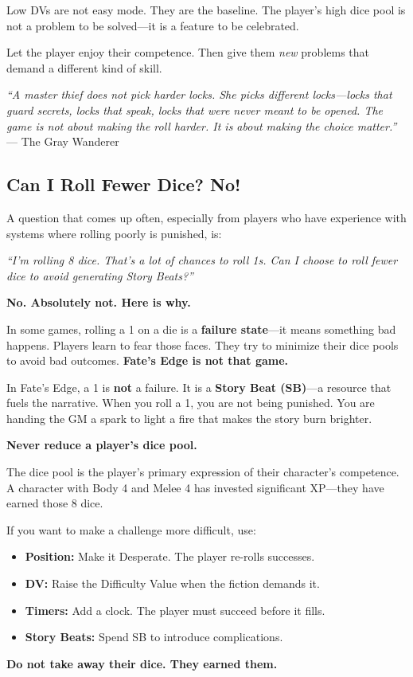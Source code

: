 Low DVs are not easy mode. They are the baseline. The player's high dice pool is not a problem to be solved---it is a feature to be celebrated.

Let the player enjoy their competence. Then give them \textit{new} problems that demand a different kind of skill.

\textit{``A master thief does not pick harder locks. She picks different locks---locks that guard secrets, locks that speak, locks that were never meant to be opened. The game is not about making the roll harder. It is about making the choice matter.''}
--- The Gray Wanderer

\subsection{Can I Roll Fewer Dice? No!}
\label{sub:why-no-fewer-dice}

A question that comes up often, especially from players who have experience with systems where rolling poorly is punished, is:

\textit{``I'm rolling 8 dice. That's a lot of chances to roll 1s. Can I choose to roll fewer dice to avoid generating Story Beats?''}

\textbf{No. Absolutely not. Here is why.}

In some games, rolling a 1 on a die is a \textbf{failure state}---it means something bad happens. Players learn to fear those faces. They try to minimize their dice pools to avoid bad outcomes. \textbf{Fate's Edge is not that game.}

In Fate's Edge, a 1 is \textbf{not} a failure. It is a \textbf{Story Beat (SB)}---a resource that fuels the narrative. When you roll a 1, you are not being punished. You are handing the GM a spark to light a fire that makes the story burn brighter.

\begin{tcolorbox}[colback=black!5,colframe=black!75!black,title=The Golden Rule of Dice Pools,breakable]

\textbf{Never reduce a player's dice pool.}

The dice pool is the player's primary expression of their character's competence. A character with Body 4 and Melee 4 has invested significant XP---they have earned those 8 dice.

If you want to make a challenge more difficult, use:
\begin{itemize}
  \item \textbf{Position:} Make it Desperate. The player re-rolls successes.
  \item \textbf{DV:} Raise the Difficulty Value when the fiction demands it.
  \item \textbf{Timers:} Add a clock. The player must succeed before it fills.
  \item \textbf{Story Beats:} Spend SB to introduce complications.
\end{itemize}

\textbf{Do not take away their dice. They earned them.}
\end{tcolorbox}

